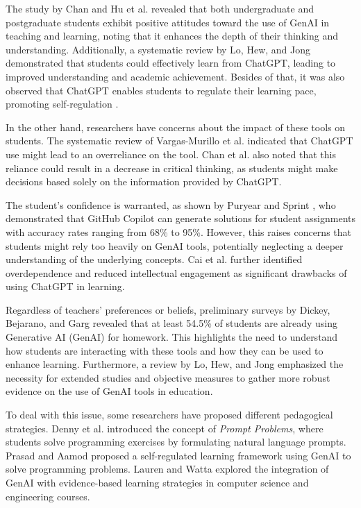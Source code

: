 \documentclass[conference]{IEEEtran}
\begin{document}
The study by Chan and Hu et al. \cite{chan23} revealed that both undergraduate
and postgraduate students exhibit positive attitudes toward the use of GenAI
in teaching and learning, noting that it enhances the depth of their thinking
and understanding. Additionally, a systematic review by Lo, Hew, and Jong
\cite{Lo24} demonstrated that students could effectively learn from ChatGPT,
leading to improved understanding and academic achievement. Besides of that,
it was also observed  that ChatGPT enables students to regulate their learning
pace, promoting self-regulation \cite{Baha24} \cite{cai23}.

In the other hand, researchers have concerns about the impact of these
tools on students. The systematic review of Vargas-Murillo et al.
\cite{Murillo23} indicated that ChatGPT use might lead to an overreliance on the
tool. Chan et al. \cite{chan23} also noted that this reliance could result in a
decrease in critical thinking, as students might make decisions based solely on
the information provided by ChatGPT.

The student's confidence is warranted, as shown by Puryear and Sprint
\cite{Puryear22}, who demonstrated that GitHub Copilot can generate solutions
for student assignments with accuracy rates ranging from 68\% to 95\%. However,
this raises concerns that students might rely too heavily on GenAI tools,
potentially neglecting a deeper understanding of the underlying concepts.
Cai et al. \cite{cai23} further identified overdependence and reduced
intellectual engagement as significant drawbacks of using ChatGPT in learning.

Regardless of teachers' preferences or beliefs, preliminary surveys by Dickey,
Bejarano, and Garg \cite{Dickey24} revealed that at least 54.5\% of students are
already using Generative AI (GenAI) for homework. This highlights the need to
understand how students are interacting with these tools and how they can be
used to enhance learning. Furthermore, a review by Lo, Hew, and Jong \cite{Lo24}
emphasized the necessity for extended studies and objective measures to gather
more robust evidence on the use of GenAI tools in education.


To deal with this issue, some researchers have proposed different pedagogical
strategies. Denny et al. \cite{Denny24} introduced the concept of \textit{Prompt
Problems}, where students solve programming exercises by formulating natural
language prompts. Prasad and Aamod \cite{Prasad24} proposed a self-regulated
learning framework using GenAI to solve programming problems. Lauren and Watta
\cite{Lauren23} explored the integration of GenAI with evidence-based
learning strategies in computer science and engineering courses.
\end{document}
